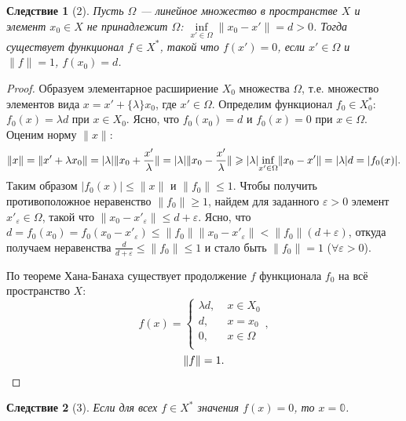 \documentclass[12pt,a4paper,titlepage,oneside]{book}
\theoremstyle{definition}
\theoremstyle{plain}
\theoremstyle{break}
\theoremstyle{remark}
\theoremstyle{remark}
\theoremstyle{remark}
\theoremstyle{remark}
\theoremstyle{plain}
\theoremstyle{plain}
\newtheorem*{corollary}{Следствие}
\begin{document}
\begin{corollary}[2]
Пусть $\Omega$ --- линейное множество в пространстве $X$ и элемент $x_0 \in X$ не принадлежит $\Omega$: $\inf \limits_{x' \in \Omega} \lVert x_0-x' \rVert = d>0$. Тогда существует функционал $f \in X^*$, такой что $f(x')=0$, если $x' \in \Omega$ и $\lVert f \rVert = 1$, $f(x_0)=d$.
\end{corollary}
\begin{proof}
Образуем элементарное расшириение $X_0$ множества $\Omega$, т.е. множество элементов вида $x=x'+\{ \lambda \}x_0$, где $x' \in \Omega$. Определим функционал $f_0 \in X^*_0$: $f_0(x)=\lambda d$ при $x \in X_0$. Ясно, что $f_0(x_0)=d$ и $f_0(x)=0$ при $x \in \Omega$. Оценим норму $\lVert x \rVert$:
\begin{equation*}
\lVert x\rVert=\lVert x'+\lambda x_0\rVert= \vert \lambda \vert \lVert x_0+\frac{x'}{\lambda}\rVert= \vert \lambda  \vert \lVert x_0-\frac{x'}{\lambda}\rVert \geqslant  \vert  \lambda  \vert  \smash{\displaystyle \inf_{x' \in \Omega}}\lVert x_0-x' \rVert= \vert  \lambda  \vert d= \vert f_0(x) \vert .
\end{equation*}
Таким образом $ \vert f_0(x) \vert \leqslant \lVert x \rVert$ и $\lVert f_0 \rVert \leqslant 1$.
Чтобы получить противоположное неравенство $\lVert f_0 \rVert \geqslant 1$, найдем для заданного $\varepsilon > 0$ элемент $x'_{\varepsilon}\in \Omega$, такой что $\lVert x_0-x'_{\varepsilon} \rVert \leqslant d+\varepsilon$. Ясно, что $d=f_0(x_0)=f_0(x_0-x'_{\varepsilon})\leqslant \lVert f_0\rVert\lVert x_0-x'_{\varepsilon} \rVert < \lVert f_0\rVert (d+\varepsilon)$, откуда получаем неравенства $\frac{d}{d+\varepsilon}\leqslant \lVert f_0\rVert \leqslant 1$ и стало быть $\lVert f_0\rVert=1$ ($\forall \varepsilon > 0$).

По теореме Хана-Банаха существует продолжение $f$ функционала $f_0$ на всё пространство $X$:
\begin{equation*}
f(x) =
\begin{cases}
\lambda d, \; &x \in X_0\\
d, \; &x = x_0\\
0, \; &x \in \Omega\\
\end{cases},
\end{equation*}
\begin{equation*}
\lVert f \rVert=1.
\qedhere
\end{equation*}
\end{proof}

\begin{corollary}[3]
Если для всех $f \in X^*$ значения $f(x)=0$, то $x=\mathbb{0}$.
\end{corollary}
\end{document}
